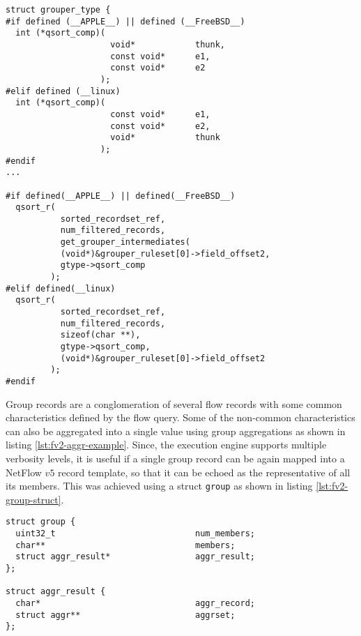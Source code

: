 \begin{lstlisting}
struct grouper_type {
#if defined (__APPLE__) || defined (__FreeBSD__)
  int (*qsort_comp)(
                     void*            thunk,
                     const void*      e1,
                     const void*      e2
                   );
#elif defined (__linux)
  int (*qsort_comp)(
                     const void*      e1,
                     const void*      e2,
                     void*            thunk
                   );
#endif
...

#if defined(__APPLE__) || defined(__FreeBSD__)
  qsort_r(
           sorted_recordset_ref,
           num_filtered_records,
           get_grouper_intermediates(
           (void*)&grouper_ruleset[0]->field_offset2,
           gtype->qsort_comp
         );
#elif defined(__linux)
  qsort_r(
           sorted_recordset_ref,
           num_filtered_records,
           sizeof(char **),
           gtype->qsort_comp,
           (void*)&grouper_ruleset[0]->field_offset2
         );
#endif
\end{lstlisting}

Group records are a conglomeration of several flow records with some common
characteristics defined by the flow query. Some of the non-common
characteristics can also be aggregated into a single value using group
 aggregations as shown in
listing \ref{lst:fv2-aggr-example}. Since, the execution engine supports
multiple verbosity levels, it is useful if a single group record can be again
mapped into a NetFlow $v5$ record template, so that it can be echoed as the
representative of all its members. This was achieved using a struct
\texttt{group} as shown in listing \ref{lst:fv2-group-struct}.

\begin{lstlisting}
struct group {
  uint32_t                            num_members;
  char**                              members;
  struct aggr_result*                 aggr_result;
};

struct aggr_result {
  char*                               aggr_record;
  struct aggr**                       aggrset;
};

\end{lstlisting}

